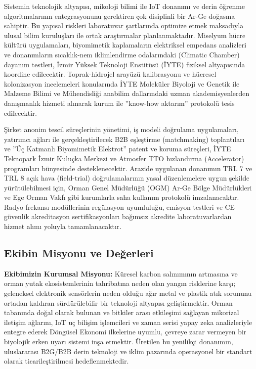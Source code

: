 \documentclass[11pt,a4paper]{article}
\begin{document}
Sistemin teknolojik altyapısı, mikoloji bilimi ile IoT donanımı ve derin öğrenme algoritmalarının entegrasyonunu gerektiren çok disiplinli bir Ar-Ge doğasına sahiptir. Bu yapısal riskleri laboratuvar şartlarında optimize etmek maksadıyla ulusal bilim kuruluşları ile ortak araştırmalar planlanmaktadır. Miselyum hücre kültürü uygulamaları, biyomimetik kaplamaların elektriksel empedans analizleri ve donanımların sıcaklık-nem iklimlendirme odalarındaki (Climatic Chamber) dayanım testleri, İzmir Yüksek Teknoloji Enstitüsü (İYTE) fiziksel altyapısında koordine edilecektir. Toprak-hidrojel arayüzü kalibrasyonu ve hücresel kolonizasyon incelemeleri konularında İYTE Moleküler Biyoloji ve Genetik ile Malzeme Bilimi ve Mühendisliği anabilim dallarındaki uzman akademisyenlerden danışmanlık hizmeti alınarak kurum ile ''know-how aktarım'' protokolü tesis edilecektir.

Şirket anonim tescil süreçlerinin yönetimi, iş modeli doğrulama uygulamaları, yatırımcı ağları ile gerçekleştirilecek B2B eşleştirme (matchmaking) toplantıları ve ''Üç Katmanlı Biyomimetik Elektrot'' patent ve koruma süreçleri, İYTE Teknopark İzmir Kuluçka Merkezi ve Atmosfer TTO hızlandırma (Accelerator) programları bünyesinde desteklenecektir. Arazide uygulanan donanımın TRL 7 ve TRL 8 açık hava (field-trial) doğrulamalarının yasal düzenlemelere uygun şekilde yürütülebilmesi için, Orman Genel Müdürlüğü (OGM) Ar-Ge Bölge Müdürlükleri ve Ege Orman Vakfı gibi kurumlarla saha kullanım protokolü imzalanacaktır. Radyo frekansı modüllerinin regülasyon uyumluluğu, emisyon testleri ve CE güvenlik akreditasyon sertifikasyonları bağımsız akredite laboratuvarlardan hizmet alımı yoluyla tamamlanacaktır.

\subsection{Ekibin Misyonu ve Değerleri}

\textbf{Ekibimizin Kurumsal Misyonu:} Küresel karbon salınımının artmasına ve orman yutak ekosistemlerinin tahribatına neden olan yangın risklerine karşı; geleneksel elektronik sensörlerin neden olduğu ağır metal ve plastik atık sorununu ortadan kaldıran sürdürülebilir bir teknoloji altyapısı geliştirmektir. Orman tabanında doğal olarak bulunan ve bitkiler arası etkileşimi sağlayan mikorizal iletişim ağlarını, IoT uç bilişim işlemcileri ve zaman serisi yapay zeka analizleriyle entegre ederek Döngüsel Ekonomi ilkelerine uyumlu, çevreye zarar vermeyen bir biyolojik erken uyarı sistemi inşa etmektir. Üretilen bu yenilikçi donanımın, uluslararası B2G/B2B derin teknoloji ve iklim pazarında operasyonel bir standart olarak ticarileştirilmesi hedeflenmektedir.
\end{document}
